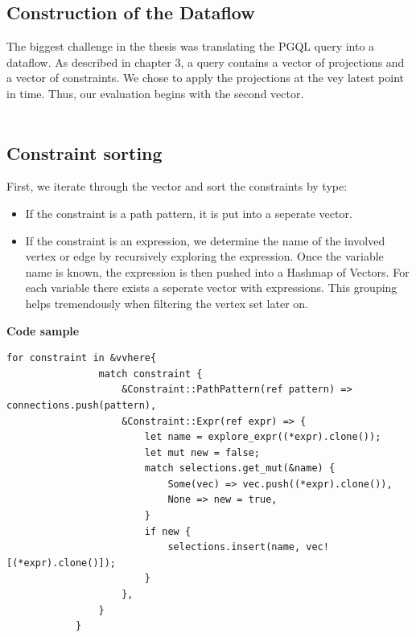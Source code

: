 \documentclass[11pt,singlecolumn]{scrartcl}
\begin{document}
\subsection{Construction of the Dataflow}
The biggest challenge in the thesis was translating the PGQL query into a dataflow. As described in chapter 3, a query contains a vector of projections and a vector of constraints. We chose to apply the projections at the vey latest point in time. Thus, our evaluation begins with the second vector.\\\\
\subsection{Constraint sorting}
First, we iterate through the vector and sort the constraints by type:\\
\begin{itemize}
\item If the constraint is a path pattern, it is put into a seperate vector.
\item If the constraint is an expression, we determine the name of the involved vertex or edge by recursively exploring the expression. Once the variable name is known, the expression is then pushed into a Hashmap of Vectors. For each variable there exists a seperate vector with expressions. This grouping helps tremendously when filtering the vertex set later on.
\end{itemize}
\textbf{Code sample}
\begin{lstlisting}
for constraint in &vvhere{
                match constraint {
                    &Constraint::PathPattern(ref pattern) => connections.push(pattern),
                    &Constraint::Expr(ref expr) => {
                        let name = explore_expr((*expr).clone());
                        let mut new = false;
                        match selections.get_mut(&name) {
                            Some(vec) => vec.push((*expr).clone()),
                            None => new = true,
                        }
                        if new {
                            selections.insert(name, vec![(*expr).clone()]);
                        }
                    },
                }
            }
\end{lstlisting}
\end{document}
